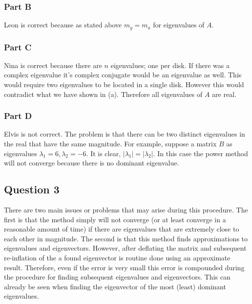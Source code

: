 \subsubsection{Part B}

Leon is correct because as stated above \(m_g = m_a\) for eigenvalues of \(A\).


\subsubsection{Part C}

Nina is correct because there are \(n\) eigenvalues; one per disk.
If there was a complex eigenvalue it's complex conjugate would be an eigenvalue as well.
This would require two eigenvalues to be located in a single disk.
However this would contradict what we have shown in (a).
Therefore all eigenvalues of \(A\) are real.

\subsubsection{Part D}

Elvis is not correct.
The problem is that there can be two distinct eigenvalues in the real that have the same magnitude.
For example, suppose a matrix \(B\) as eigenvalues \(\lambda_{1} = 6, \lambda_{2} = -6\).
It is clear, \(|\lambda_{1}| = |\lambda_{2}|\).
In this case the power method will not converge because there is no dominant eigenvalue.

\newpage
\subsection{Question 3}


\newpage


There are two main issues or problems that may arise during this procedure.
The first is that the method simply will not converge (or at least converge in a reasonable amount of time) if there are eigenvalues that are extremely close to each other in magnitude.
The second is that this method finds approximations to eigenvalues and eigenvectors.
However, after deflating the matrix and subsequent re-inflation of the a found eigenvector is routine done using an approximate result.
Therefore, even if the error is very small this error is compounded during the procedure for finding subsequent eigenvalues and eigenvectors.
This can already be seen when finding the eigenvector of the  most (least) dominant eigenvalues.

